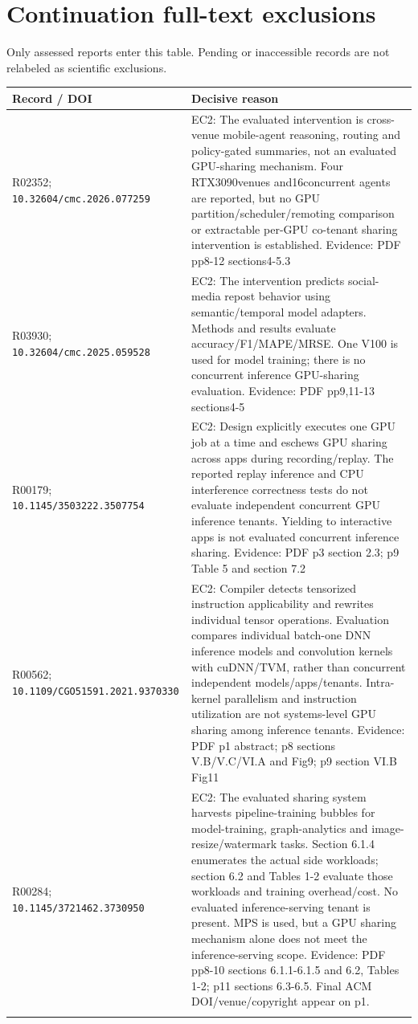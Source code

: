 \section{Continuation full-text exclusions}
Only assessed reports enter this table. Pending or inaccessible records are not relabeled as scientific exclusions.
\begin{longtable}{>{\raggedright\arraybackslash}p{}>{\raggedright\arraybackslash}p{}}
\toprule
\textbf{Record / DOI} & \textbf{Decisive reason}\\\midrule\endhead
R02352; \nolinkurl{10.32604/cmc.2026.077259} & EC2: The evaluated intervention is cross-venue mobile-agent reasoning,\allowbreak{} routing and policy-gated summaries,\allowbreak{} not an evaluated GPU-sharing mechanism. Four RTX3090venues and16concurrent agents are reported,\allowbreak{} but no GPU partition/scheduler/remoting comparison or extractable per-GPU co-tenant sharing intervention is established. Evidence: PDF pp8-12 sections4-5.3\\\addlinespace
R03930; \nolinkurl{10.32604/cmc.2025.059528} & EC2: The intervention predicts social-media repost behavior using semantic/temporal model adapters. Methods and results evaluate accuracy/F1/MAPE/MRSE. One V100 is used for model training;\allowbreak{} there is no concurrent inference GPU-sharing evaluation. Evidence: PDF pp9,\allowbreak{}11-13 sections4-5\\\addlinespace
R00179; \nolinkurl{10.1145/3503222.3507754} & EC2: Design explicitly executes one GPU job at a time and eschews GPU sharing across apps during recording/replay. The reported replay inference and CPU interference correctness tests do not evaluate independent concurrent GPU inference tenants. Yielding to interactive apps is not evaluated concurrent inference sharing. Evidence: PDF p3 section 2.3;\allowbreak{} p9 Table 5 and section 7.2\\\addlinespace
R00562; \nolinkurl{10.1109/CGO51591.2021.9370330} & EC2: Compiler detects tensorized instruction applicability and rewrites individual tensor operations. Evaluation compares individual batch-one DNN inference models and convolution kernels with cuDNN/TVM,\allowbreak{} rather than concurrent independent models/apps/tenants. Intra-kernel parallelism and instruction utilization are not systems-level GPU sharing among inference tenants. Evidence: PDF p1 abstract;\allowbreak{} p8 sections V.B/V.C/VI.A and Fig9;\allowbreak{} p9 section VI.B Fig11\\\addlinespace
R00284; \nolinkurl{10.1145/3721462.3730950} & EC2: The evaluated sharing system harvests pipeline-training bubbles for model-training,\allowbreak{} graph-analytics and image-resize/watermark tasks. Section 6.1.4 enumerates the actual side workloads;\allowbreak{} section 6.2 and Tables 1-2 evaluate those workloads and training overhead/cost. No evaluated inference-serving tenant is present. MPS is used,\allowbreak{} but a GPU sharing mechanism alone does not meet the inference-serving scope. Evidence: PDF pp8-10 sections 6.1.1-6.1.5 and 6.2,\allowbreak{} Tables 1-2;\allowbreak{} p11 sections 6.3-6.5. Final ACM DOI/venue/copyright appear on p1.\\\addlinespace

\end{longtable}
